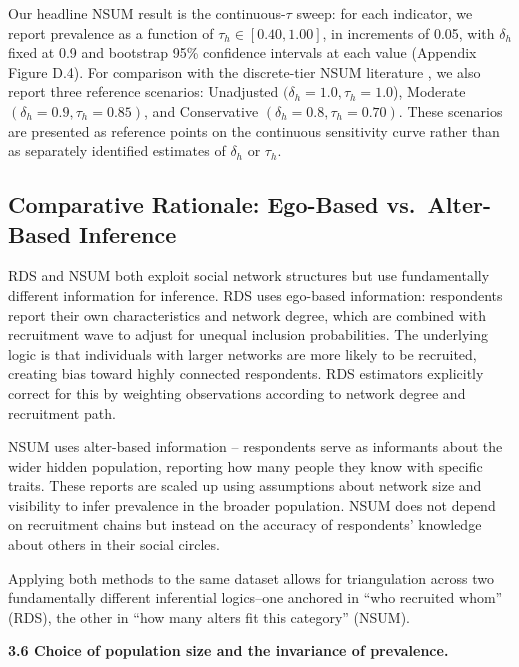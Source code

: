 \documentclass[
  12pt,
  letterpaper,
  DIV=11,
  numbers=noendperiod]{scrartcl}
\begin{document}
Our headline NSUM result is the continuous-\(\tau\) sweep: for each
indicator, we report prevalence as a function of
\(\tau_h \in [0.40, 1.00]\), in increments of 0.05, with \(\delta_h\)
fixed at 0.9 and bootstrap 95\% confidence intervals at each value
(Appendix Figure D.4). For comparison with the discrete-tier NSUM
literature
\autocite{kill98-social,malt15-estimating,feeh16-generalizing}, we also
report three reference scenarios: Unadjusted
\((\delta_h = 1.0, \tau_h = 1.0\)), Moderate
\((\delta_h = 0.9, \tau_h = 0.85)\), and Conservative
\((\delta_h = 0.8, \tau_h = 0.70)\). These scenarios are presented as
reference points on the continuous sensitivity curve rather than as
separately identified estimates of \(\delta_h\) or \(\tau_h\).

\subsection{Comparative Rationale: Ego-Based vs.~Alter-Based
Inference}\label{sec-comparative-rationale}

RDS and NSUM both exploit social network structures but use
fundamentally different information for inference. RDS uses ego-based
information: respondents report their own characteristics and network
degree, which are combined with recruitment wave to adjust for unequal
inclusion probabilities. The underlying logic is that individuals with
larger networks are more likely to be recruited, creating bias toward
highly connected respondents. RDS estimators explicitly correct for this
by weighting observations according to network degree and recruitment
path.

NSUM uses alter-based information -- respondents serve as informants
about the wider hidden population, reporting how many people they know
with specific traits. These reports are scaled up using assumptions
about network size and visibility to infer prevalence in the broader
population. NSUM does not depend on recruitment chains but instead on
the accuracy of respondents' knowledge about others in their social
circles.

Applying both methods to the same dataset allows for triangulation
across two fundamentally different inferential logics--one anchored in
``who recruited whom'' (RDS), the other in ``how many alters fit this
category'' (NSUM).

\textbf{3.6 Choice of population size and the invariance of prevalence.}
\end{document}
